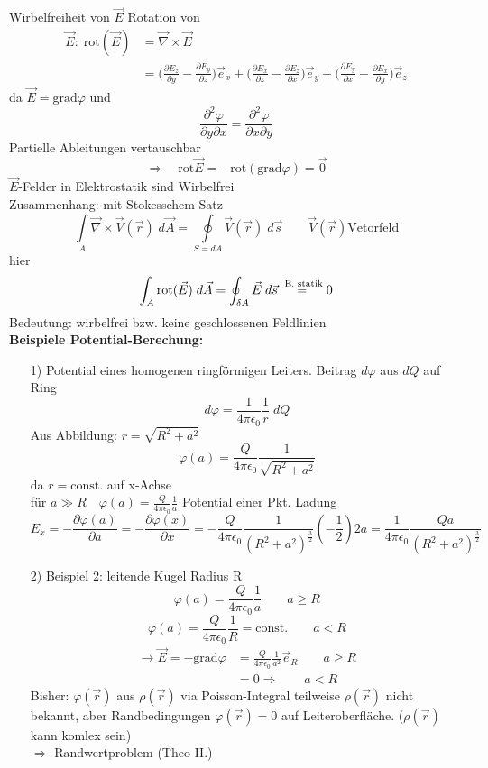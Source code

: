 \documentclass[titlepage,12pt,a4paper,ngerman]{report}
\newcommand{\tx}[1]{\textrm{#1}}
\newcommand{\grad}{\tx{grad}}
\newcommand{\const}{\tx{const.}}
\begin{document}
\underline{Wirbelfreiheit von $\vec{E}$}
Rotation von 
\begin{align*}
\vec{E}:\; \tx{rot}(\vec{E}) &= \vec{\nabla} \times \vec{E} \\
&= \bigg( \frac{\partial E_z}{\partial y} - \frac{\partial E_y}{\partial z} \bigg) \vec{e}_x + \bigg( \frac{\partial E_x}{\partial z} - \frac{\partial E_z}{\partial x} \bigg) \vec{e}_y + \bigg( \frac{\partial E_y}{\partial x} - \frac{\partial E_x}{\partial y} \bigg) \vec{e}_z
\end{align*}
da $\vec{E} = \textrm{grad} \varphi $ und 
$$ \frac{\partial^2 \varphi}{\partial y \partial x} = \frac{\partial^2 \varphi}{\partial x \partial y}$$
Partielle Ableitungen vertauschbar
$$ \Rightarrow \quad \textrm{rot} \vec{E} = - \textrm{rot}(\textrm{grad} \varphi ) = \vec{0}$$
$\vec{E}$-Felder in Elektrostatik sind Wirbelfrei\\
Zusammenhang: mit Stokesschem Satz
$$\int\limits_{A} \vec{\nabla} \times \vec{V}(\vec{r}) \; d\vec{A} = \oint\limits _{S= dA} \vec{V}(\vec{r}) \; d \vec{s} \qquad \vec{V}(\vec{r}) \textrm{Vetorfeld}$$
hier
$$\int_{A} \tx{rot}(\vec{E}) \; d\vec{A} = \oint_{\delta A} \vec{E} \; d\vec{s} \buildrel \textrm{\ E. statik}\over= 0 $$
Bedeutung: wirbelfrei bzw. keine geschlossenen Feldlinien\\[5pt]
\textbf{Beispiele Potential-Berechung:}
\begin{itemize}
\item[1)] Potential eines homogenen ringförmigen Leiters. Beitrag $d\varphi$ aus $dQ$ auf Ring
$$ d\varphi = \frac{1}{4\pi\epsilon_0} \frac{1}{r} \;dQ$$
Aus Abbildung: $r = \sqrt{R^2 + a^2}$
$$ \varphi(a) = \frac{Q}{4\pi\epsilon_0} \frac{1}{\sqrt{R^2 + a^2}}$$
da $r = \const$ auf x-Achse\\
für $a\gg R \quad \varphi(a) = \frac{Q}{4\pi\epsilon_0} \frac{1}{a}$ Potential einer Pkt. Ladung
$$E_x = -\frac{\partial \varphi(a)}{\partial a}= -\frac{\partial\varphi(x)}{\partial x} = -\frac{Q}{4\pi\epsilon_0} \frac{1}{(R^2 + a^2)^{\frac{3}{2}}} \left(-\frac{1}{2}\right) 2 a = \frac{1}{4\pi\epsilon_0} \frac{Q a}{(R^2 + a^2)^{\frac{3}{2}}}$$
\item[2)] Beispiel 2: leitende Kugel Radius R
$$\varphi(a) = \frac{Q}{4\pi\epsilon_0} \frac{1}{a} \qquad a\ge R$$
$$ \varphi(a) = \frac{Q}{4\pi\epsilon_0} \frac{1}{R} = \tx{const.} \qquad a < R$$
\begin{align*}
\rightarrow \vec{E} = - \grad \varphi &= \frac{Q}{4\pi\epsilon_0} \frac{1}{a^2} \vec{e}_R \qquad a\ge R \\
 &= 0 \Rightarrow \qquad a < R
\end{align*}
Bisher: $\varphi(\vec{r})$ aus $\rho(\vec{r})$ via Poisson-Integral teilweise $\rho(\vec{r})$ nicht bekannt, aber Randbedingungen $\varphi(\vec{r}) = 0 $ auf Leiteroberfläche. ($\rho(\vec{r})$ kann komlex sein)\\
$\Rightarrow$ Randwertproblem (Theo II.)
\end{itemize}
\end{document}
